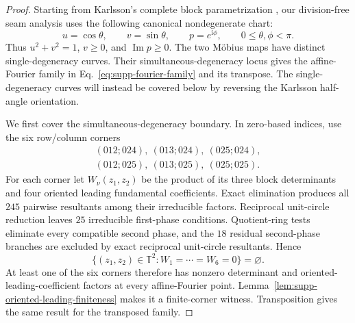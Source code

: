 \documentclass[aps,prx,reprint,nofootinbib,twoside,superscriptaddress,longbibliography,floatfix]{revtex4-2}
\theoremstyle{definition}
\newcommand{\T}{\mathbb T}
\newcommand{\I}{\mathrm i}
\begin{document}
\begin{proof}
Starting from Karlsson's complete block parametrization \cite{Karlsson2011H2,Karlsson2011ThreeParameter}, our division-free seam analysis uses the following canonical nondegenerate chart:
\begin{equation}
u=\cos\theta,\qquad v=\sin\theta,\qquad p=e^{\I\phi},
\qquad
0\leq\theta,\phi<\pi.
\label{eq:supp-karlsson-canonical}
\end{equation}
Thus $u^2+v^2=1$, $v\geq0$, and $\operatorname{Im}p\geq0$. The two M\"obius maps have distinct single-degeneracy curves.  Their simultaneous-degeneracy locus gives the affine-Fourier family in Eq.~\eqref{eq:supp-fourier-family} and its transpose.  The single-degeneracy curves will instead be covered below by reversing the Karlsson half-angle orientation.

We first cover the simultaneous-degeneracy boundary. In zero-based indices, use the six row/column corners
\begin{equation}
\begin{gathered}
(012;024),\ (013;024),\ (025;024),\\
(012;025),\ (013;025),\ (025;025).
\end{gathered}
\label{eq:supp-fourier-six-corners}
\end{equation}
For each corner let $W_\nu(z_1,z_2)$ be the product of its three block determinants and four oriented leading fundamental coefficients. Exact elimination produces all $245$ pairwise resultants among their irreducible factors. Reciprocal unit-circle reduction leaves $25$ irreducible first-phase conditions. Quotient-ring tests eliminate every compatible second phase, and the $18$ residual second-phase branches are excluded by exact reciprocal unit-circle resultants. Hence
\begin{equation}
\{(z_1,z_2)\in\T^2:W_1=\cdots=W_6=0\}=\varnothing.
\label{eq:supp-fourier-no-common-zero}
\end{equation}
At least one of the six corners therefore has nonzero determinant and oriented-leading-coefficient factors at every affine-Fourier point. Lemma~\ref{lem:supp-oriented-leading-finiteness} makes it a finite-corner witness. Transposition gives the same result for the transposed family.


\end{proof}
\end{document}

